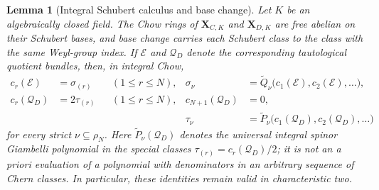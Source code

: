 \documentclass[11pt,a4paper,oneside]{amsart}
\numberwithin{equation}{section}
\newtheorem{lemma}[theorem]{Lemma}
\theoremstyle{definition}
\theoremstyle{remark}
\begin{document}
\begin{lemma}[Integral Schubert calculus and base change]
\label{appA:lem:integral-base-change}
Let $K$ be an algebraically closed field.  The Chow rings of
$\mathbf X_{C,K}$ and $\mathbf X_{D,K}$ are free abelian on their
Schubert bases, and base change carries each Schubert class to the class
with the same Weyl-group index.  If $\mathcal E$ and $\mathcal Q_D$ denote
the corresponding tautological quotient bundles, then, in integral Chow,
\begin{align}
 c_r(\mathcal E)&=\sigma_{(r)} &&(1\leq r\leq N),
 &\sigma_\nu&=\widetilde Q_\nu
   \bigl(c_1(\mathcal E),c_2(\mathcal E),\ldots\bigr),
 \label{appA:eq:integral-Giambelli-C}\\
 c_r(\mathcal Q_D)&=2\tau_{(r)} &&(1\leq r\leq N),
 &c_{N+1}(\mathcal Q_D)&=0,
 \label{appA:eq:integral-special-D}\\
 &&&
 &\tau_\nu&=\widetilde P_\nu
   \bigl(c_1(\mathcal Q_D),c_2(\mathcal Q_D),\ldots\bigr)
 \label{appA:eq:integral-Giambelli-D}
\end{align}
for every strict $\nu\subseteq\rho_N$.  Here
$\widetilde P_\nu(\mathcal Q_D)$ denotes the universal integral spinor
Giambelli polynomial in the special classes
$\tau_{(r)}=c_r(\mathcal Q_D)/2$; it is not an a priori evaluation of a
polynomial with denominators in an arbitrary sequence of Chern classes.
In particular, these identities remain valid in characteristic two.
\end{lemma}
\end{document}
